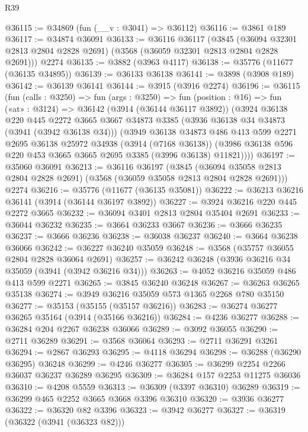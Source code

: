 \begin{lexlean}{R39}
\begin{coremodule}
@36115 := @34869 (fun (__v : @3041) => @36112)
@36116 := @3861 @189
@36117 := @34874 @36091
@36133 := @36116
    @36117
    (@3845 (@36094 @32301 @2813 @2804 @2828 @2691) (@3568 (@36059 @32301 @2813 @2804 @2828 @2691)))
    @2274
@36135 := @3882 (@3963 @4117)
@36138 := @35776 (@11677 (@36135 @34895))
@36139 := @36133 @36138
@36141 := @3898 (@3908 @189)
@36142 := @36139 @36141
@36144 := @3915 (@3916 @2274)
@36196 := @36115
    (fun (calls : @3250) =>
    fun (args : @3250) =>
    fun (position : @16) =>
    fun («at» : @3124) =>
    @36142
      (@3914 (@36144 @36117 @3892))
      (@3924
        @36138
        @220
        @445
        @2272
        @3665
        @3667
        @34873
        @3385
        (@3936 @36138 @34 @34873 (@3941 (@3942 @36138 @34)))
        (@3949
          @36138
          @34873
          @486
          @413
          @599
          @2271
          @2695
          @36138
          @25972
          @34938
          (@3914 (@7168 @36138))
          (@3986 @36138 @596 @220 @453 @3665 @3665 @2695 @3385 (@3996 @36138) @11821))))
@36197 := @35060 @36091
@36213 := @36116
    @36197
    (@3845 (@36094 @35058 @2813 @2804 @2828 @2691) (@3568 (@36059 @35058 @2813 @2804 @2828 @2691)))
    @2274
@36216 := @35776 (@11677 (@36135 @35081))
@36222 := @36213 @36216 @36141 (@3914 (@36144 @36197 @3892))
@36227 := @3924 @36216 @220 @445 @2272 @3665
@36232 := @36094 @3401 @2813 @2804 @35404 @2691
@36233 := @36044 @36232
@36235 := @3664 @36233 @3667
@36236 := @3666 @36235
@36237 := @3666 @36236
@36238 := @36038 @36237
@36240 := @3664 @36238 @36066
@36242 := @36227 @36240 @35059
@36248 := @3568 (@35757 @36055 @2804 @2828 @36064 @2691)
@36257 := @36242 @36248 (@3936 @36216 @34 @35059 (@3941 (@3942 @36216 @34)))
@36263 := @4052 @36216 @35059 @486 @413 @599 @2271
@36265 := @3845 @36240 @36248
@36267 := @36263 @36265 @35138
@36274 := @3949 @36216 @35059 @573 @1365 @2268 @780 @35150
@36277 := @35153 (@35155 (@35157 @36216))
@36283 := @36274 @36277 @36265 @35164 (@3914 (@35166 @36216))
@36284 := @4236 @36277
@36288 := @36284 @204 @2267 @36238 @36066
@36289 := @3092 @36055
@36290 := @2711 @36289
@36291 := @3568 @36064
@36293 := @2711 @36291 @3261
@36294 := @2867 @36293
@36295 := @4118 @36294
@36298 := @36288 (@36290 @36295) @36248
@36299 := @4246 @36277
@36305 := @36299 @2254 @2266 @36037 @36237 @36289 @36295
@36309 := @36284 @157 @2253 @11275 @36036
@36310 := @4208 @5559
@36313 := @36309 (@3397 @36310) @36289
@36319 := @36299 @465 @2252 @3665 @3668 @3396 @36310
@36320 := @3936 @36277
@36322 := @36320 @82 @3396
@36323 := @3942 @36277
@36327 := @36319 (@36322 (@3941 (@36323 @82)))

\end{coremodule}
\end{lexlean}
